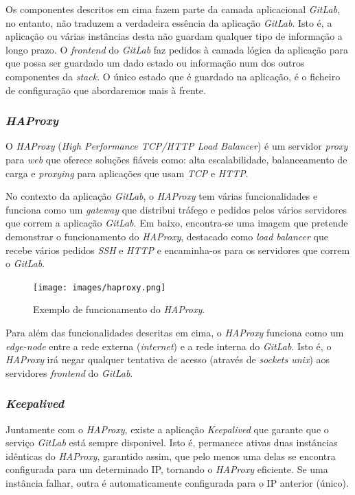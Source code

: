 \documentclass[12pt,a4paper]{article}
\begin{document}
Os componentes descritos em cima fazem parte da camada aplicacional \emph{GitLab}, no entanto, não traduzem a verdadeira essência da aplicação \emph{GitLab}. Isto é, a aplicação ou várias instâncias desta não guardam qualquer tipo de informação a longo prazo. O \emph{frontend} do \emph{GitLab} faz pedidos à camada lógica da aplicação para que possa ser guardado um dado estado ou informação num dos outros componentes da \emph{stack}. O único estado que é guardado na aplicação, é o ficheiro de configuração que abordaremos mais à frente.

\subsubsection{\emph{HAProxy}}
O \emph{HAProxy} (\emph{High Performance TCP/HTTP Load Balancer}) é um servidor \emph{proxy} para \emph{web} que oferece soluções fiáveis como: alta escalabilidade, balanceamento de carga e \emph{proxying} para aplicações que usam \emph{TCP} e \emph{HTTP}.

No contexto da aplicação \emph{GitLab}, o \emph{HAProxy} tem várias funcionalidades e funciona como um \emph{gateway} que distribui tráfego e pedidos pelos vários servidores que correm a aplicação \emph{GitLab}. Em baixo, encontra-se uma imagem que pretende demonstrar o funcionamento do \emph{HAProxy}, destacado como \emph{load balancer} que recebe vários pedidos \emph{SSH} e \emph{HTTP} e encaminha-os para os servidores que correm o \emph{GitLab}.

\begin{figure}[H]
  \centering
  \texttt{[image: images/haproxy.png]}
  \caption{Exemplo de funcionamento do \emph{HAProxy}.}
\end{figure}

Para além das funcionalidades descritas em cima, o \emph{HAProxy} funciona como um \emph{edge-node} entre a rede externa (\emph{internet}) e a rede interna do \emph{GitLab}. Isto é, o \emph{HAProxy} irá negar qualquer tentativa de acesso (através de \emph{sockets unix}) aos servidores \emph{frontend} do \emph{GitLab}.


\subsubsection{\emph{Keepalived}}
Juntamente com o \emph{HAProxy}, existe a aplicação \emph{Keepalived} que garante que o serviço \emph{GitLab} está sempre disponivel. Isto é, permanece ativas duas instâncias idênticas do \emph{HAProxy}, garantido assim, que pelo menos uma delas se encontra configurada para um determinado IP, tornando o \emph{HAProxy} eficiente. Se uma instância falhar, outra é automaticamente configurada para o IP anterior (único).
\end{document}
